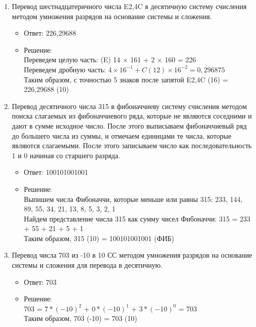 \documentclass[14pt,final,oneside]{extreport}%
\begin{document}
\begin{enumerate}
        \item Перевод шестнадцатеричного числа E2,4C в десятичную систему счисления методом умножения разрядов на основание системы и сложения.
        \begin{itemize}
            \item Ответ: 226,29688
            \item Решение: \\
                Переведем целую часть: (E) 14 × 161 + 2 × 160 = 226 \\
                Переведем дробную часть: \( 4 \times 16^{-1} + C (12) \times 16^{-2} = 0,296875 \) \\ 
                Таким образом, с точностью 5 знаков после запятой E2,4C (16) = 226,29688 (10)
        \end{itemize}

        \item Перевод десятичного числа 315 в фибоначчиеву систему счисления методом поиска слагаемых из фибоначчиевого ряда, которые не являются соседними и дают в сумме исходное число. После этого выписываем фибоначчиевый ряд до большего числа из суммы, и отмечаем единицами те числа, которые являются слагаемыми. После этого записываем число как последовательность 1 и 0 начиная со старшего разряда.
        \begin{itemize}
            \item Ответ: 100101001001
            \item Решение: \\
                Выпишем числа Фибоначчи, которые меньше или равны 315: 233, 144, 89, 55, 34, 21, 13, 8, 5, 3, 2, 1 \\
                Найдем представление числа 315 как сумму чисел Фибоначчи: 315 = 233 + 55 + 21 + 5 + 1 \\
                Таким образом, 315 (10) = 100101001001 (ФИБ)
        \end{itemize}

        \item Перевод числа 703 из -10 в 10 СС методом умножения разрядов на основание системы и сложения для перевода в десятичную.
        \begin{itemize}
            \item Ответ: 703
            \item Решение: \\
                703 = ${7*(-10)^2}$ + ${0*(-10)^1}$ + ${3*(-10)^0}$ = 703 \\
                Таким образом, 703 (-10) = 703 (10)
        \end{itemize}


\end{enumerate}
\end{document}
